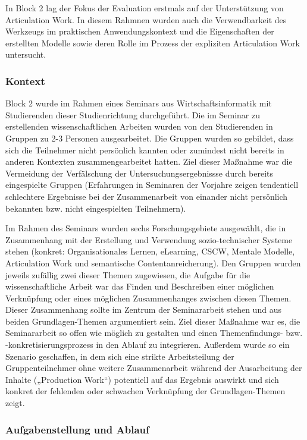 In Block 2 lag der Fokus der Evaluation erstmals auf der Unterstützung von Articulation Work. In diesem Rahmnen wurden auch die Verwendbarkeit des Werkzeugs im praktischen Anwendungskontext und die Eigenschaften der erstellten Modelle sowie deren Rolle im Prozess der expliziten Articulation Work untersucht.

\subsubsection{Kontext} %
\label{ssub:2_kontext}

Block 2 wurde im Rahmen eines Seminars aus Wirtschaftsinformatik mit Studierenden dieser Studienrichtung durchgeführt. Die im Seminar zu erstellenden wissenschaftlichen Arbeiten wurden von den Studierenden in Gruppen zu 2-3 Personen ausgearbeitet. Die Gruppen wurden so gebildet, dass sich die Teilnehmer nicht persönlich kannten oder zumindest nicht bereits in anderen Kontexten zusammengearbeitet hatten. Ziel dieser Maßnahme war die Vermeidung der Verfälschung der Untersuchungsergebnissse durch bereits eingespielte Gruppen (Erfahrungen in Seminaren der Vorjahre zeigen tendentiell schlechtere Ergebnisse bei der Zusammenarbeit von einander nicht persönlich bekannten bzw. nicht eingespielten Teilnehmern).

Im Rahmen des Seminars wurden sechs Forschungsgebiete ausgewählt, die in Zusammenhang mit der Erstellung und Verwendung sozio-technischer Systeme stehen (konkret: Organisationales Lernen, eLearning, \gls{CSCW}, Mentale Modelle, Articulation Work und semantische Contentanreicherung). Den Gruppen wurden jeweils zufällig zwei dieser Themen zugewiesen, die Aufgabe für die wissenschaftliche Arbeit war das Finden und Beschreiben einer möglichen Verknüpfung oder eines möglichen Zusammenhanges zwischen diesen Themen. Dieser Zusammenhang sollte im Zentrum der Seminararbeit stehen und aus beiden Grundlagen-Themen argumentiert sein. Ziel dieser Maßnahme war es, die Seminararbeit so offen wie möglich zu gestalten und einen Themenfindungs- bzw. -konkretisierungsprozess in den Ablauf zu integrieren. Außerdem wurde so ein Szenario geschaffen, in dem sich eine strikte Arbeitsteilung der Gruppenteilnehmer ohne weitere Zusammenarbeit während der Ausarbeitung der Inhalte („Production Work“) potentiell auf das Ergebnis auswirkt und sich konkret der fehlenden oder schwachen Verknüpfung der Grundlagen-Themen zeigt.


\subsubsection{Aufgabenstellung und Ablauf} %
\label{ssub:2_aufgabenstellung}

